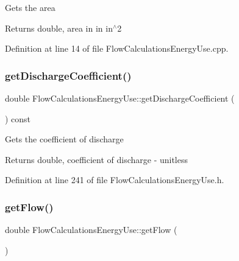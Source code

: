Gets the area

\begin{DoxyReturn}{Returns}
double, area in in in$^\wedge$2 
\end{DoxyReturn}


Definition at line 14 of file Flow\+Calculations\+Energy\+Use.\+cpp.

\mbox{\label{class_flow_calculations_energy_use_a28033765df3a220b5c7d75e34fd95c43}} 
\subsubsection{\texorpdfstring{get\+Discharge\+Coefficient()}{getDischargeCoefficient()}}
{\footnotesize\ttfamily double Flow\+Calculations\+Energy\+Use\+::get\+Discharge\+Coefficient (\begin{DoxyParamCaption}{ }\end{DoxyParamCaption}) const\hspace{0.3cm}{\ttfamily [inline]}}

Gets the coefficient of discharge

\begin{DoxyReturn}{Returns}
double, coefficient of discharge -\/ unitless 
\end{DoxyReturn}


Definition at line 241 of file Flow\+Calculations\+Energy\+Use.\+h.

\mbox{\label{class_flow_calculations_energy_use_a6b892e984bd09e821cb642f8f8efd221}} 
\subsubsection{\texorpdfstring{get\+Flow()}{getFlow()}}
{\footnotesize\ttfamily double Flow\+Calculations\+Energy\+Use\+::get\+Flow (\begin{DoxyParamCaption}{ }\end{DoxyParamCaption})}

